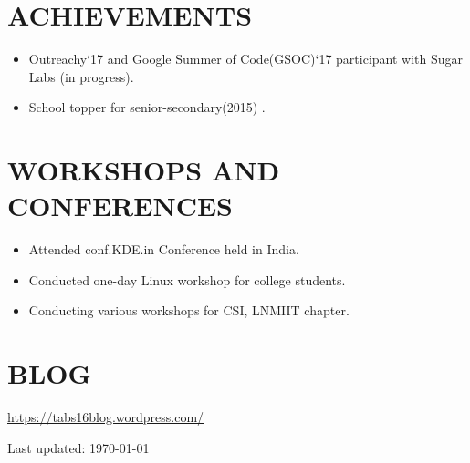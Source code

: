 \documentclass[margin]{res}
\begin{document}
\begin{resume}
\section{ACHIEVEMENTS}
	\begin{itemize}
		\item Outreachy`17 and Google Summer of Code(GSOC)`17 participant with Sugar Labs (in progress). 
		\item School topper for senior-secondary(2015) .
	\end{itemize}

\section{WORKSHOPS AND CONFERENCES}
	
	\begin{itemize}
		\item Attended conf.KDE.in Conference held in India.
		\item Conducted one-day Linux workshop for college students.
		\item Conducting various workshops for CSI, LNMIIT chapter.
\end{itemize} 

\section{BLOG}
\url{https://tabs16blog.wordpress.com/}

 
\begin{center}
  \begin{footnotesize}
    Last updated: \today \\
  \end{footnotesize}
\end{center}

\end{resume}
\end{document}
